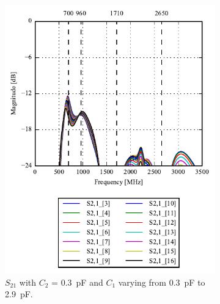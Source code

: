 \begin{figure}[htbp]
\begin{subfigure}[b]{0.49\linewidth}
        \includegraphics{img/tech_sol/monopole/talk_mode/s21_s11}
        \caption{$S_{21}$ with $C_2$ = \SI{0.3}{pF} and $C_1$ varying from \SI{0.3}{pF} to \SI{2.9}{pF}.}
        \label{fig:ant1_s11}
    \end{subfigure}
    \hfill
    \begin{subfigure}[b]{0.49\linewidth}
        \centering

\end{subfigure}
\end{figure}
